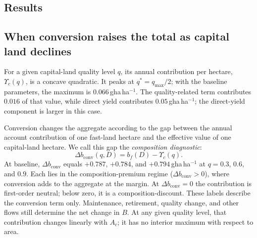 \documentclass[preprint,12pt,authoryear]{elsarticle}
\newcommand{\dconv}{\Delta b_{\mathrm{conv}}}
\newcommand{\Ups}{\Upsilon_c}
\begin{document}
\begin{samepage}
\section{Results}\label{sec:results}

\subsection{When conversion raises the total as capital land declines}\label{sec:mask}

For a given capital-land quality level $q$, its annual contribution per hectare, $\Ups(q)$, is a concave quadratic. It peaks at $q^*=q_{\max}/2$; with the baseline parameters, the maximum is $0.066$\,gha\,ha$^{-1}$. The quality-related term contributes $0.016$ of that value, while direct yield contributes $0.05$\,gha\,ha$^{-1}$; the direct-yield component is larger in this case.\par
\end{samepage}

Conversion changes the aggregate according to the gap between the annual account contribution of one fast-land hectare and the effective value of one capital-land hectare. We call this gap the \emph{composition diagnostic}:
\begin{equation}\label{eq:dconv}
\dconv(q,D)=b_f(D)-\Ups(q).
\end{equation}
At baseline, $\dconv$ equals $+0.787$, $+0.784$, and $+0.794$\,gha\,ha$^{-1}$ at $q=0.3$, $0.6$, and $0.9$. Each lies in the composition-premium regime ($\dconv>0$), where conversion adds to the aggregate at the margin. At $\dconv=0$ the contribution is first-order neutral; below zero, it is a composition-discount. These labels describe the conversion term only. Maintenance, retirement, quality change, and other flows still determine the net change in $B$. At any given quality level, that contribution changes linearly with $A_c$; it has no interior maximum with respect to area.
\end{document}
